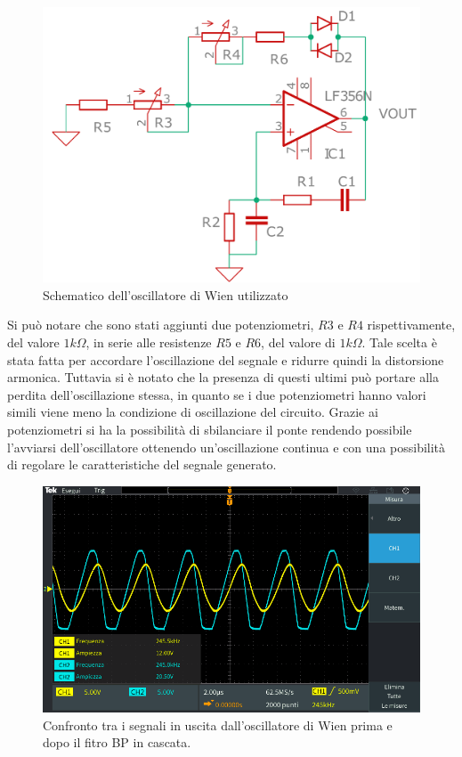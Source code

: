 \documentclass[titlepage]{report}
\begin{document}
	\begin{figure}[H]
		\centering
		\includegraphics[scale=0.5]{Immagini/sch_osc_wien_cad.pdf}
		\caption{Schematico dell'oscillatore di Wien utilizzato}
		\label{sch:osc_wien}
	\end{figure}

	Si può notare che sono stati aggiunti due potenziometri, $R3$ e $R4$ rispettivamente, del valore  $1k\Omega$,  in serie alle resistenze $R5$ e $R6$, del valore di  $1k\Omega$. Tale scelta è stata fatta per accordare l'oscillazione del segnale e ridurre quindi la distorsione armonica. Tuttavia si è notato che la presenza di questi ultimi può portare alla perdita dell'oscillazione stessa, in quanto se i due potenziometri hanno valori simili viene meno la condizione di oscillazione del circuito. Grazie ai potenziometri  si ha la possibilità di sbilanciare il ponte rendendo possibile l'avviarsi dell'oscillatore ottenendo un'oscillazione continua e con una possibilità di regolare le caratteristiche del segnale generato.

	\begin{figure}[H]
		\centering
		\includegraphics[scale=0.5]{Immagini/osc_wien+bp210k.PNG}
		\caption{Confronto tra i segnali in uscita dall'oscillatore di Wien prima e dopo il fitro BP in cascata.}
		\label{fig:SINwien+BP}
	\end{figure}
\end{document}
